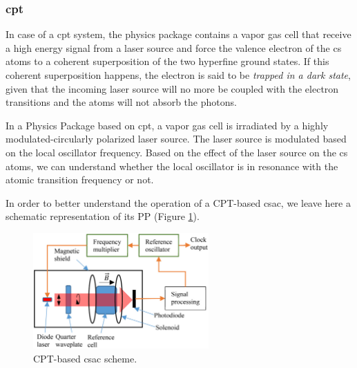 \subsubsection{\acrfull{cpt}}
\label{sssec:CPT}

In case of a \acrfull{cpt} system, the physics package contains a vapor gas cell that receive a high energy signal from a laser source and force the valence electron of the \acrfull{cs} atoms to a coherent superposition of the two hyperfine ground states.
If this coherent superposition happens, the electron is said to be \textit{trapped in a dark state}, given that the incoming laser source will no more be coupled with the electron transitions and the atoms will not absorb the photons.

In a Physics Package based on \acrfull{cpt}, a vapor gas cell is irradiated by a highly modulated-circularly polarized laser source.
The laser source is modulated based on the local oscillator frequency.
Based on the effect of the laser source on the \acrfull{cs} atoms, we can understand whether the local oscillator is in resonance with the atomic transition frequency or not.

In order to better understand the operation of a CPT-based \acrshort{csac}, we leave here a schematic representation of its PP (Figure \ref{fig:CPT-physics-package-scheme}).

\begin{figure}[H]
    \centering
    \includegraphics[width=0.6\textwidth, max width=\linewidth]{img/CPT-phisics-package-scheme.png}
    \caption{
        CPT-based \acrshort{csac} scheme.
    }
    \label{fig:CPT-physics-package-scheme}
\end{figure}


